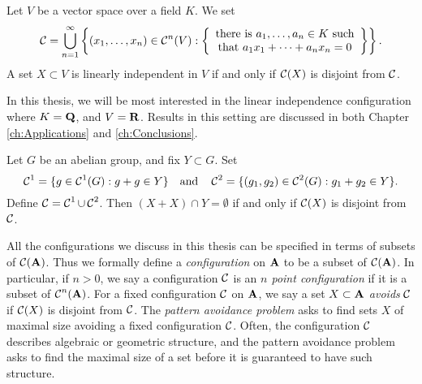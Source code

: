 \begin{example}
	Let $V$ be a vector space over a field $K$. We set
	\[ \operatorname{\mathcal{C}} = \bigcup_{n = 1}^\infty \left\{ (x_1, \dots, x_n) \in \operatorname{\mathcal{C}}^n(V): \left\{ \begin{array}{c}
			\text{there is $a_1, \dots, a_n \in K$ such}\\
			\text{that $a_1x_1 + \dots + a_nx_n = 0$}
		\end{array} \right\} \right\}. \]
	A set $X \subset V$ is linearly independent in $V$ if and only if $\operatorname{\mathcal{C}}(X)$ is disjoint from $\operatorname{\mathcal{C}}$.
\end{example}

\begin{remark}
	In this thesis, we will be most interested in the linear independence configuration where $K = \operatorname{\mathbf{Q}}$, and $V = \operatorname{\mathbf{R}}$. Results in this setting are discussed in both Chapter \ref{ch:Applications} and \ref{ch:Conclusions}.
\end{remark}

\begin{example}
	Let $G$ be an abelian group, and fix $Y \subset G$. Set
	\[ \operatorname{\mathcal{C}}^1 = \{ g \in \operatorname{\mathcal{C}}^1(G): g + g \in Y \} \quad \text{and} \quad \operatorname{\mathcal{C}}^2 = \{ (g_1,g_2) \in \operatorname{\mathcal{C}}^2(G): g_1 + g_2 \in Y \}. \]
	Define $\operatorname{\mathcal{C}} = \operatorname{\mathcal{C}}^1 \cup \operatorname{\mathcal{C}}^2$. Then $(X + X) \cap Y = \emptyset$ if and only if $\operatorname{\mathcal{C}}(X)$ is disjoint from $\operatorname{\mathcal{C}}$.
\end{example}

All the configurations we discuss in this thesis can be specified in terms of subsets of $\operatorname{\mathcal{C}}(\operatorname{\mathbf{A}})$. Thus we formally define a \emph{configuration} on $\operatorname{\mathbf{A}}$ to be a subset of $\operatorname{\mathcal{C}}(\operatorname{\mathbf{A}})$. In particular, if $n > 0$, we say a configuration $\operatorname{\mathcal{C}}$ is an \emph{$n$ point configuration} if it is a subset of $\operatorname{\mathcal{C}}^n(\operatorname{\mathbf{A}})$. For a fixed configuration $\operatorname{\mathcal{C}}$ on $\operatorname{\mathbf{A}}$, we say a set $X \subset \operatorname{\mathbf{A}}$ \emph{avoids} $\operatorname{\mathcal{C}}$ if $\operatorname{\mathcal{C}}(X)$ is disjoint from $\operatorname{\mathcal{C}}$. The \emph{pattern avoidance problem} asks to find sets $X$ of maximal size avoiding a fixed configuration $\operatorname{\mathcal{C}}$. Often, the configuration $\operatorname{\mathcal{C}}$ describes algebraic or geometric structure, and the pattern avoidance problem asks to find the maximal size of a set before it is guaranteed to have such structure.


